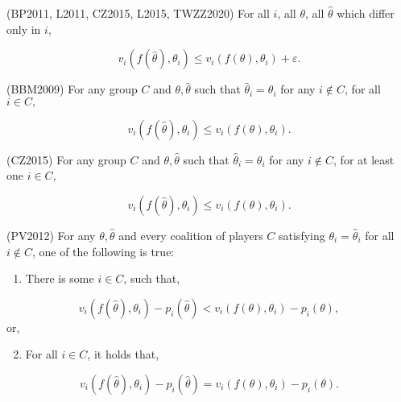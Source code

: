\documentclass{article}
\begin{document}
\begin{df} \label{df:sp2} 
(BP2011, L2011, CZ2015, L2015, TWZZ2020) For all $i $, all $\theta$, all $\hat{\theta}$ which differ only in $i, $
\end{df}
\begin{equation} 
v_{i}\left(f\left(\hat{\theta}\right), \theta_{i}\right) \leq  v_{i}\left(f\left(\theta\right), \theta_{i}\right) + \varepsilon.
\end{equation}

\begin{df} \label{df:sp3} 
(BBM2009) For any group $C $ and $\theta, \hat{\theta}$ such that $\hat{\theta}_{i} = \theta_{i}$ for any $i  \notin C $, for all $i  \in C, $
\end{df}
\begin{equation} 
v_{i}\left(f\left(\hat{\theta}\right), \theta_{i}\right) \leq  v_{i}\left(f\left(\theta\right), \theta_{i}\right).
\end{equation}

\begin{df} \label{df:sp4} 
(CZ2015) For any group $C $ and $\theta, \hat{\theta}$ such that $\hat{\theta}_{i} = \theta_{i}$ for any $i  \notin C $, for at least one $i  \in C, $
\end{df}
\begin{equation} 
v_{i}\left(f\left(\hat{\theta}\right), \theta_{i}\right) \leq  v_{i}\left(f\left(\theta\right), \theta_{i}\right).
\end{equation}

\begin{df} \label{df:sp5} 
(PV2012) For any $\theta, \hat{\theta}$ and every coalition of players $C $ satisfying $\theta_{i} = \hat{\theta}_{i}$ for all $i  \notin C $, one of the following is true:
\end{df}
\begin{enumerate}
\item There is some $i  \in C $, such that,
\end{enumerate}
\begin{equation} 
v_{i}\left(f\left(\hat{\theta}\right), \theta_{i}\right) - p_{i}\left(\hat{\theta}\right) < v_{i}\left(f\left(\theta\right), \theta_{i}\right) - p_{i}\left(\theta\right),
\end{equation}
or,
\begin{enumerate}
\setcounter{enumi}{1}
\item For all $i  \in C $, it holds that,
\end{enumerate}
\begin{equation} 
v_{i}\left(f\left(\hat{\theta}\right), \theta_{i}\right) - p_{i}\left(\hat{\theta}\right) = v_{i}\left(f\left(\theta\right), \theta_{i}\right) - p_{i}\left(\theta\right).
\end{equation}
\end{document}
